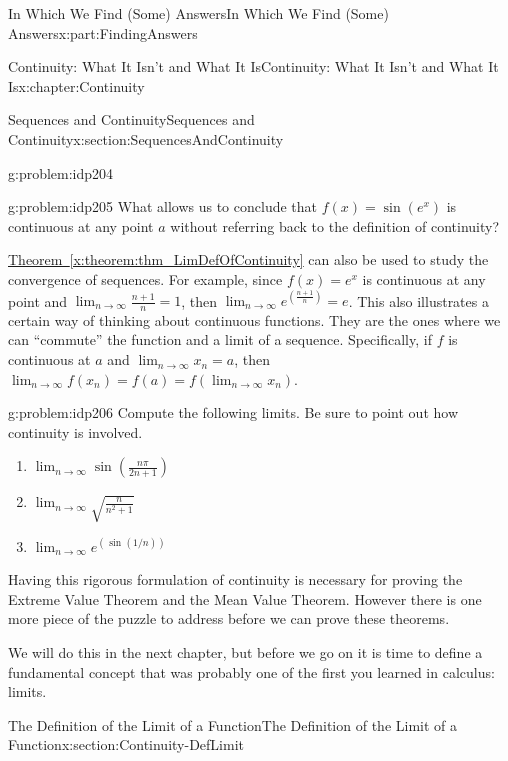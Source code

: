 \documentclass[oneside,10pt,]{book}
\newcommand{\xreffont}{\relax}
\numberwithin{equation}{section}
\begin{document}
\begin{partptx}{In Which We Find (Some) Answers}{}{In Which We Find (Some) Answers}{}{}{x:part:FindingAnswers}
\begin{chapterptx}{Continuity: What It Isn't and What It Is}{}{Continuity: What It Isn't and What It Is}{}{}{x:chapter:Continuity}
\begin{sectionptx}{Sequences and Continuity}{}{Sequences and Continuity}{}{}{x:section:SequencesAndContinuity}
\begin{problem}{}{g:problem:idp204}
\begin{enumerate}[font=\bfseries,label=(\alph*),ref=\alph*]
\end{enumerate}
\end{problem}
\begin{problem}{}{g:problem:idp205}%
What allows us to conclude that \(f(x)=\sin\left(e^x\right)\) is continuous at any point \(a\) without referring back to the definition of continuity?%
\end{problem}
\hyperref[x:theorem:thm_LimDefOfContinuity]{Theorem~{\xreffont\ref{x:theorem:thm_LimDefOfContinuity}}} can also be used to study the convergence of sequences.  For example, since \(f(x)=e^x\) is continuous at any point and \(\lim_{n\rightarrow\infty}\frac{n+1}{n}=1\), then \(\lim_{n\rightarrow\infty}e^{\left(\frac{n+1}{n}\right)}=e\). This also illustrates a certain way of thinking about continuous functions.  They are the ones where we can ``commute'' the function and a limit of a sequence.  Specifically, if \(f\) is continuous at \(a\) and \(\lim_{n\rightarrow\infty}x_n=a\), then \(\lim_{n\rightarrow\infty}f(x_n)=f(a)=f\left(\lim_{n\rightarrow\infty}x_n\right)\).%
\begin{problem}{}{g:problem:idp206}%
Compute the following limits. Be sure to point out how continuity is involved.%
\begin{enumerate}[font=\bfseries,label=(\alph*),ref=\alph*]
\item{}\(\displaystyle\lim_{n\rightarrow\infty}\sin\left(\frac{n\pi}{2n+1}\right)\)%
\item{}\(\displaystyle\lim_{n\rightarrow\infty}\sqrt{\frac{n}{n^2+1}}\)%
\item{}\(\displaystyle\lim_{n\rightarrow\infty}e^{\left(\text{ sin } \left(1/n\right)\right)}\)%
\end{enumerate}
\end{problem}
Having this rigorous formulation of continuity is necessary for proving the Extreme Value Theorem and the Mean Value Theorem. However there is one more piece of the puzzle to address before we can prove these theorems.%
\par
We will do this in the next chapter, but before we go on it is time to define a fundamental concept that was probably one of the first you learned in calculus: limits.%
\end{sectionptx}
%
%
\typeout{************************************************}
\typeout{************************************************}
%
\begin{sectionptx}{The Definition of the Limit of a Function}{}{The Definition of the Limit of a Function}{}{}{x:section:Continuity-DefLimit}

\end{sectionptx}
\end{chapterptx}
\end{partptx}
\end{document}
